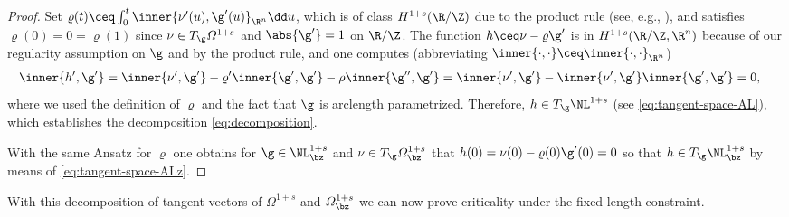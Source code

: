 \begin{proof}
Set $\varrho(t)\ceq\int_0^t \inner{\nu'(u),\g'(u)}_{\R^n} \dd u$, which is of class
$H^{1+s}(\R/\Z)$ due to the product rule (see, e.g., \cite[Proposition A.5]{knappmann-etal_2023}), and satisfies $\varrho(0)=0=\varrho(1)$ since $\nu\in T_\g\varOmega^{1+s}$ and
$\abs{\g'}=1$ on $\R/\Z$. The function $h\ceq\nu-\varrho\g'$ is in $H^{1+s}(\R/\Z,\R^n)$
because of our regularity assumption on $\g$ and by the product rule, and one
computes (abbreviating $\inner{\cdot,\cdot} \ceq \inner{\cdot,\cdot}_{\R^n}$)
\begin{align*}
	\inner{h',\g'} 
	&=
	\inner{\nu',\g'} -\varrho' \inner{\g',\g'}-\rho \inner{\g'',\g'}
	=
	\inner{\nu',\g'} - \inner{\nu',\g'} \inner{\g',\g'}
	=
	0,
\end{align*}
where we used the definition of $\varrho$ and the fact that $\g$ is arclength parametrized.
Therefore, $h\in T_\g\NL^{1+s}$ (see \cref{eq:tangent-space-AL}), which establishes the decomposition \cref{eq:decomposition}.

With the same Ansatz for $\varrho$ one obtains for $\g\in\NL^{1+s}_\bz$ 
and $\nu
\in T_\g\varOmega_\bz^{1+s}$ that $h(0)=\nu(0)-\varrho(0)\g'(0)=0$ so that 
$h\in T_\g\NL^{1+s}_\bz$ by means of \cref{eq:tangent-space-ALz}.
\end{proof}
With this decomposition of tangent vectors of $\varOmega^{1+s}$ and 
$\varOmega^{1+s}_\bz$ we can
now prove criticality under the fixed-length constraint.

